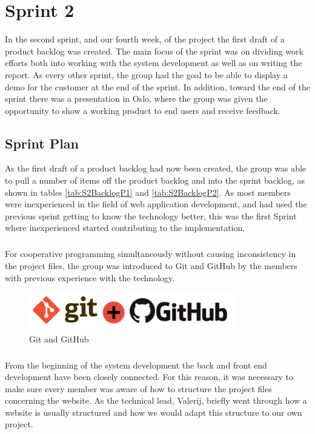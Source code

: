 \chapter{Sprint 2}
\label{chap:S2}
In the second sprint, and our fourth week, of the project the first draft of a product backlog was created. The main focus of the sprint was on dividing work efforts both into working with the system development as well as on writing the report. As every other sprint, the group had the goal to be able to display a demo for the customer at the end of the sprint. In addition, toward the end of the sprint there was a presentation in Oslo, where the group was given the opportunity to show a working product to end users and receive feedback.

\section{Sprint Plan}
\label{sec:S2Plan}
As the first draft of a product backlog had now been created, the group was able to pull a number of items off the product backlog and into the sprint backlog, as shown in tables \ref{tab:S2BacklogP1} and \ref{tab:S2BacklogP2}. As most members were inexperienced in the field of web application development, and had used the previous sprint getting to know the technology better, this was the first Sprint where inexperienced started contributing to the implementation. 

\paragraph{}For cooperative programming simultaneously without causing inconsistency in the project files, the group was introduced to Git and GitHub by the members with previous experience with the technology.

\begin{figure}[ht!]
\centering
\includegraphics[width=90mm]{Sprint2/img/Sprint2-GitnGithub.png}
\caption{Git and GitHub \label{fig:S2PlanGit}}
\end{figure}

\paragraph{} From the beginning of the system development the back and front end development have been closely connected. For this reason, it was necessary to make sure every member was aware of how to structure the project files concerning the website. As the technical lead, Valerij, briefly went through how a website is usually structured and how we would adapt this structure to our own project.

